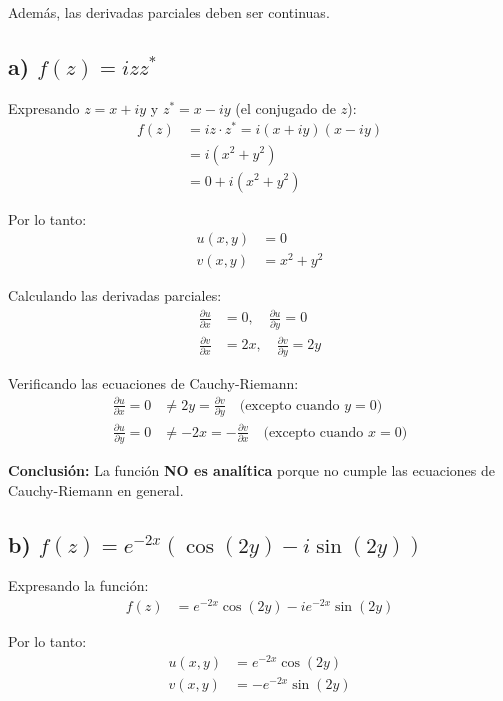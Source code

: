 \documentclass{article}
\begin{document}
Además, las derivadas parciales deben ser continuas.

\subsection*{a) $f(z) = izz^*$}

Expresando $z = x + iy$ y $z^* = x - iy$ (el conjugado de $z$):
\begin{align*}
f(z) &= iz \cdot z^* = i(x + iy)(x - iy) \\
     &= i(x^2 + y^2) \\
     &= 0 + i(x^2 + y^2)
\end{align*}

Por lo tanto:
\begin{align*}
u(x,y) &= 0 \\
v(x,y) &= x^2 + y^2
\end{align*}

Calculando las derivadas parciales:
\begin{align*}
\frac{\partial u}{\partial x} &= 0, \quad \frac{\partial u}{\partial y} = 0 \\
\frac{\partial v}{\partial x} &= 2x, \quad \frac{\partial v}{\partial y} = 2y
\end{align*}

Verificando las ecuaciones de Cauchy-Riemann:
\begin{align*}
\frac{\partial u}{\partial x} = 0 &\neq 2y = \frac{\partial v}{\partial y} \quad \text{(excepto cuando } y = 0\text{)} \\
\frac{\partial u}{\partial y} = 0 &\neq -2x = -\frac{\partial v}{\partial x} \quad \text{(excepto cuando } x = 0\text{)}
\end{align*}

\textbf{Conclusión:} La función \textbf{NO es analítica} porque no cumple las ecuaciones de Cauchy-Riemann en general.

\subsection*{b) $f(z) = e^{-2x}(\cos(2y) - i\sin(2y))$}

Expresando la función:
\begin{align*}
f(z) &= e^{-2x}\cos(2y) - ie^{-2x}\sin(2y)
\end{align*}

Por lo tanto:
\begin{align*}
u(x,y) &= e^{-2x}\cos(2y) \\
v(x,y) &= -e^{-2x}\sin(2y)
\end{align*}
\end{document}
